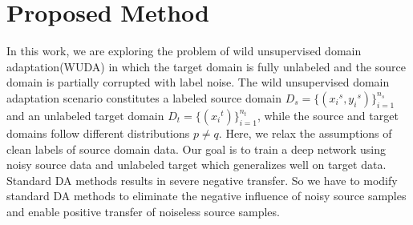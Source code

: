 \section{Proposed Method}
In this work, we are exploring the problem of wild unsupervised domain adaptation(WUDA) in which the target domain is fully unlabeled and the source domain is partially corrupted with label noise. The wild unsupervised domain adaptation scenario constitutes a labeled source domain ${D}_s = \{({x_i}^s, {y_i}^s)\}_{i=1}^{n_s}$ and an unlabeled target domain ${D}_t = \{({x_i}^t)\}_{i=1}^{n_t}$, while the source and target domains follow different distributions $p \neq q$. Here, we relax the assumptions of clean labels of source domain data.  Our goal is to train a deep network using noisy source data and unlabeled target which generalizes well on target data. Standard DA methods results in severe negative transfer. So we have to modify standard DA methods to eliminate the negative influence of noisy source samples and enable positive transfer of noiseless source samples.

